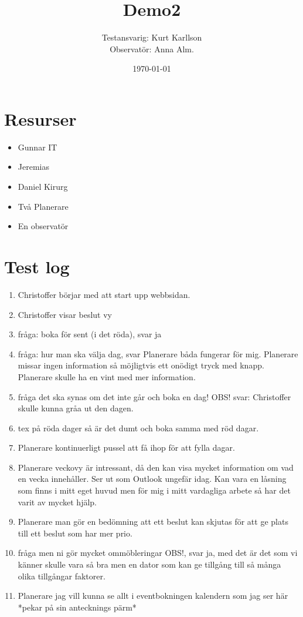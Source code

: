 \documentclass[a4paper,10pt, twoside]{article}
\title{Demo2}
\author{Testansvarig: Kurt Karllson\\Observatör: Anna Alm.}
\date{\today}
\begin{document}
\section{Resurser}
\begin{itemize}
  \item Gunnar IT
  \item Jeremias
  \item Daniel Kirurg
  \item Två Planerare
  \item En observatör
\end{itemize}

\section{Test log}

\begin{enumerate}
    \item Christoffer börjar med att start upp webbsidan.
    \item Christoffer visar beslut vy
    \item fråga: boka för sent (i det röda), svar ja
    \item fråga: hur man ska välja dag, svar Planerare båda fungerar för mig. Planerare missar ingen information så möjligtvis ett onödigt tryck med knapp. Planerare skulle ha en vint med mer information.
    \item fråga det ska synas om det inte går och boka en dag! OBS! svar: Christoffer skulle kunna gråa ut den dagen.
    \item tex på röda dager så är det dumt och boka samma med röd dagar.
    \item Planerare kontinuerligt pussel att få ihop för att fylla dagar.
    \item Planerare veckovy är intressant, då den kan visa mycket information om vad en vecka innehåller. Ser ut som Outlook ungefär idag. Kan vara en låsning som finns i mitt eget huvud men för mig i mitt vardagliga arbete så har det varit av mycket hjälp.
    \item Planerare man gör en bedömning att ett beslut kan skjutas för att ge plats till ett beslut som har mer prio.
    \item fråga men ni gör mycket ommöbleringar OBS!, svar ja, med det är det som vi känner skulle vara så bra men en dator som kan ge tillgång till så många olika tillgångar faktorer.
    \item Planerare jag vill kunna se allt i eventbokningen kalendern som jag ser här *pekar på sin antecknings pärm*

\end{enumerate}
\end{document}
